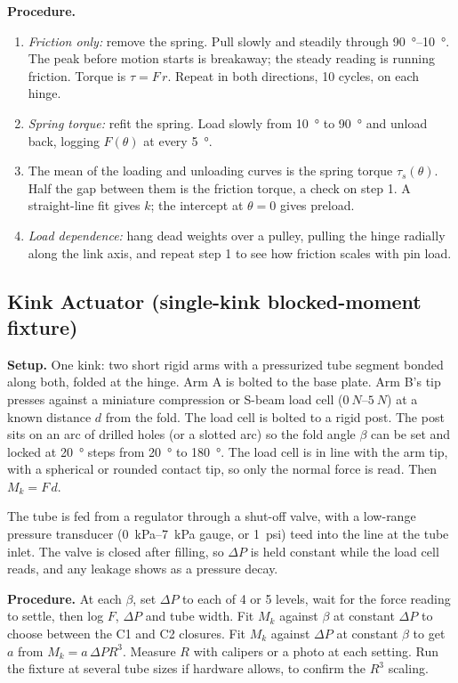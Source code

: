 \documentclass[11pt]{article}
\begin{document}
\textbf{Procedure.}
\begin{enumerate}[noitemsep]
    \item \emph{Friction only:} remove the spring. Pull slowly and steadily through \SIrange{90}{10}{\degree}.
          The peak before motion starts is breakaway; the steady reading is running friction.
          Torque is $\tau = F\,r$. Repeat in both directions, 10 cycles, on each hinge.
    \item \emph{Spring torque:} refit the spring. Load slowly from \SI{10}{\degree} to \SI{90}{\degree}
          and unload back, logging $F(\theta)$ at every \SI{5}{\degree}.
    \item The mean of the loading and unloading curves is the spring torque $\tau_s(\theta)$. Half the
          gap between them is the friction torque, a check on step 1. A straight-line fit gives $k$;
          the intercept at $\theta=0$ gives preload.
    \item \emph{Load dependence:} hang dead weights over a pulley, pulling the hinge radially along the
          link axis, and repeat step 1 to see how friction scales with pin load.
\end{enumerate}

\subsection{Kink Actuator (single-kink blocked-moment fixture)}

\textbf{Setup.} One kink: two short rigid arms with a pressurized tube segment bonded along both,
folded at the hinge. Arm A is bolted to the base plate. Arm B's tip presses against a miniature
compression or S-beam load cell ($\SIrange{0}{5}{N}$) at a known distance $d$ from the fold. The load
cell is bolted to a rigid post. The post sits on an arc of drilled holes (or a slotted arc) so the fold
angle $\beta$ can be set and locked at \SI{20}{\degree} steps from \SI{20}{\degree} to \SI{180}{\degree}.
The load cell is in line with the arm tip, with a spherical or rounded contact tip, so only the
normal force is read. Then $M_k = F\,d$.

The tube is fed from a regulator through a shut-off valve, with a low-range pressure transducer
(\SIrange{0}{7}{kPa} gauge, or \SI{1}{psi}) teed into the line at the tube inlet. The valve is closed after filling, so
$\Delta P$ is held constant while the load cell reads, and any leakage shows as a pressure decay.

\textbf{Procedure.} At each $\beta$, set $\Delta P$ to each of 4 or 5 levels, wait for the force
reading to settle, then log $F$, $\Delta P$ and tube width. Fit $M_k$ against $\beta$ at constant
$\Delta P$ to choose between the C1 and C2 closures. Fit $M_k$ against $\Delta P$ at constant $\beta$ to
get $a$ from $M_k = a\,\Delta P R^3$. Measure $R$ with calipers or a photo at each setting. Run the
fixture at several tube sizes if hardware allows, to confirm the $R^3$ scaling.
\end{document}
